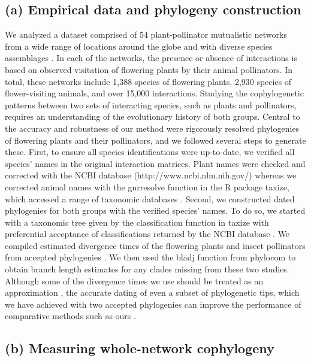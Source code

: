 \documentclass{article}
\begin{document}
\subsection*{(a) Empirical data and phylogeny construction}
We analyzed a dataset comprised of 54 plant-pollinator mutualistic networks from a wide range of locations around the globe and with diverse species assemblages \citep[Table S1]{Rezende2007}. In each of the networks, the presence or absence of interactions is based on observed visitation of flowering plants by their animal pollinators. In total, these networks include 1,388 species of flowering plants, 2,930 species of flower-visiting animals, and over 15,000 interactions.
	Studying the cophylogenetic patterns between two sets of interacting species, such as plants and pollinators, requires an understanding of the evolutionary history of both groups. Central to the accuracy and robustness of our method were rigorously resolved phylogenies of flowering plants and their pollinators, and we followed several steps to generate these. First, to ensure all species identifications were up-to-date, we verified all species' names in the original interaction matrices. Plant names were checked and corrected with the NCBI database (http://www.ncbi.nlm.nih.gov/) whereas we corrected animal names with the gnr\textunderscore resolve function in the R package taxize, which accessed a range of taxonomic databases \citep{TaxizeRef}. Second, we constructed dated phylogenies for both groups with the verified species' names. To do so, we started with a taxonomic tree given by the classification function in taxize with preferential acceptance of classifications returned by the NCBI database \citep{TaxizeRef}. We compiled estimated divergence times of the flowering plants and insect pollinators from accepted phylogenies \citep{Wikstrom2001, Misof2014}. We then used the bladj function from phylocom \citep{PhylocomRef} to obtain branch length estimates for any clades missing from these two studies. Although some of the divergence times we use should be treated as an approximation \citep{Beaulieu2007}, the accurate dating of even a subset of phylogenetic tips, which we have achieved with two accepted phylogenies \citep{Wikstrom2001, Misof2014} can improve the performance of comparative methods such as ours \citep{Webb2000}.

\subsection*{(b) Measuring whole-network cophylogeny}
\end{document}
